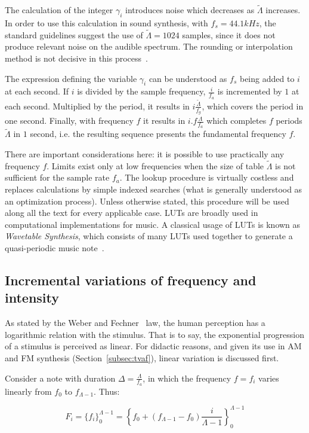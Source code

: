 The calculation of the integer $\gamma_i$ introduces noise which decreases as $\widetilde{\Lambda}$ increases.
In order to use this calculation in sound synthesis, with $f_s=44.1 kHz$, the standard guidelines suggest the use of $\widetilde{\Lambda} = 1024$ samples, since it does not produce relevant noise on the audible spectrum. The rounding or interpolation method is not decisive in this process~\cite{Geiger}.

The expression defining the variable $\gamma_i$ can be understood as $f_s$ being added to $i$ at each second.
If $i$ is divided by the sample frequency, $\frac{i}{f_a}$
is incremented by $1$ at each second. Multiplied by the period, it results in $i \frac{\widetilde{\Lambda}}{f_a}$, which covers the period in one second. Finally, with frequency $f$ it results in $i . f \frac{\widetilde{\Lambda}}{f_a}$ which completes $f$ periods $\widetilde{\Lambda}$ in $1$ second, i.e. the resulting sequence presents the fundamental frequency $f$.

There are important considerations here: it is possible to use practically any frequency $f$. Limits exist only at low frequencies when the size of table $\widetilde{\Lambda}$ is not sufficient for the sample rate $f_a$. The lookup procedure is virtually costless and replaces calculations by simple indexed searches (what is generally understood as an optimization process). Unless otherwise stated, this procedure will be used along all the text for every applicable case.
LUTs are broadly used in computational implementations for music. A classical usage of LUTs is known as \emph{Wavetable Synthesis}, which consists of many LUTs used together to generate a quasi-periodic music note~\cite{Cook,Wavetable}.

\subsection{Incremental variations of frequency and intensity}\label{subsec:vars}
As stated by the Weber and Fechner~\cite{Weber-Fechner} law, the human perception has a logarithmic relation with the stimulus. That is to say, the exponential progression of a stimulus is perceived as linear.
For didactic reasons, and given its use in AM and FM synthesis (Section~\ref{subsec:tvaf}), linear variation is discussed first.

Consider a note with duration $\Delta = \frac{\Lambda}{f_a}$, in which the frequency $f=f_i$ varies linearly from $f_0$ to $f_{\Lambda -1}$. Thus:

\begin{equation}\label{freqLinear}
 F_i=\{f_i\}_0^{\Lambda-1}=\left\{f_0 + (f_{\Lambda-1}-f_0)\frac{i}{\Lambda-1} \right\}_0^{\Lambda-1}
\end{equation}

